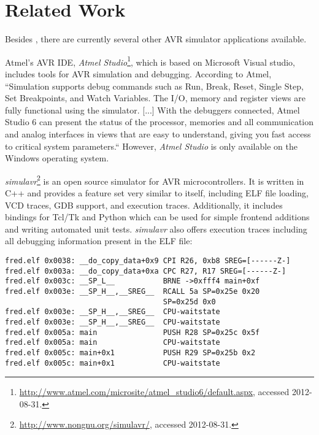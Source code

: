 
\chapter{Related Work} \label{chapter:relatedwork}

Besides \simavr, there are currently several other \ac{AVR} simulator
applications available.

Atmel's \ac{AVR} \ac{IDE}, \emph{Atmel Studio}\footnote{
%
\url{http://www.atmel.com/microsite/atmel_studio6/default.aspx}, accessed 2012-08-31.
%
}, which is based on Microsoft Visual studio, includes tools for \ac{AVR} simulation
and debugging. According to Atmel,
``Simulation supports debug commands such as Run, Break, Reset, Single Step,
Set Breakpoints, and Watch Variables. The I/O, memory and register views are
fully functional using the simulator. [...] With the debuggers connected, Atmel
Studio 6 can present the status of the processor, memories and all communication
and analog interfaces in views that are easy to understand, giving you fast
access to critical system parameters.`` \cite{atmel} However, \emph{Atmel Studio}
is only available on the Windows operating system.

\emph{simulavr}\footnote{
%
\url{http://www.nongnu.org/simulavr/}, accessed 2012-08-31.
%
} is an open source simulator for \ac{AVR} microcontrollers. It is written in
C++ and provides a feature set very similar to \simavr itself, including \ac{ELF}
file loading, \ac{VCD} traces, \ac{GDB} support, and execution traces.
Additionally, it includes bindings for Tcl/Tk and Python which can be used for
simple frontend additions and writing automated unit tests. \emph{simulavr}
also offers execution traces including all debugging information present
in the \ac{ELF} file:

\begin{verbatim}
fred.elf 0x0038: __do_copy_data+0x9 CPI R26, 0xb8 SREG=[------Z-]
fred.elf 0x003a: __do_copy_data+0xa CPC R27, R17 SREG=[------Z-]
fred.elf 0x003c: __SP_L__           BRNE ->0xfff4 main+0xf
fred.elf 0x003e: __SP_H__,__SREG__  RCALL 5a SP=0x25e 0x20
                                    SP=0x25d 0x0
fred.elf 0x003e: __SP_H__,__SREG__  CPU-waitstate
fred.elf 0x003e: __SP_H__,__SREG__  CPU-waitstate
fred.elf 0x005a: main               PUSH R28 SP=0x25c 0x5f
fred.elf 0x005a: main               CPU-waitstate
fred.elf 0x005c: main+0x1           PUSH R29 SP=0x25b 0x2
fred.elf 0x005c: main+0x1           CPU-waitstate
\end{verbatim}

